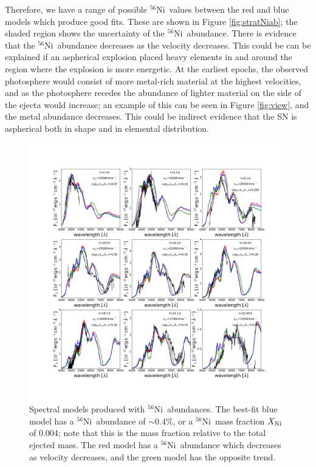 \documentclass[fleqn,usenatbib]{mnras}
\newcommand{\Nifs}{$^{56}$Ni}
\newcommand{\ab}{$\sim$}
\begin{document}
Therefore, we have a range of possible \Nifs\ values between the red and blue models which produce good fits. 
These are shown in  Figure \ref{fig:stratNiab}; the shaded region shows the uncertainty of the 
\Nifs\ abundance. 
There is evidence that the \Nifs\ abundance decreases as the velocity decreases. 
This could be can be explained if an aspherical explosion placed heavy elements in and 
around the region where the explosion is more energetic.
At the earliest epochs, the observed photosphere would  
consist of more metal-rich material at the highest velocities, 
and as the photosphere recedes the abundance of
lighter material on the side of the ejecta would increase; an example of this can be seen in Figure \ref{fig:view},
and the metal abundance decreases. 
This could be indirect evidence that the SN is aspherical both in shape and in elemental distribution.


\begin{figure}
\centering
\includegraphics[scale=0.3]{plots/mainpaper.pdf}
\caption{Spectral models produced with \Nifs\ abundances. 
The best-fit blue model has a \Nifs\ abundance of \ab0.4\%, or a \Nifs\ mass fraction $X_{\rm{Ni}}$ of 0.004; note that this is the mass fraction relative to the total ejected mass. The red model has a \Nifs\ abundance which decreases as velocity decreases, and the green model has the opposite trend.}
\label{fig:stratNi}
\end{figure}
\end{document}
